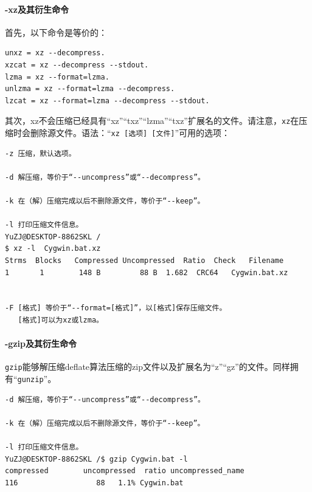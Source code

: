 \paragraph{-xz及其衍生命令}
首先，以下命令是等价的：\par
\begin{verbatim}
unxz = xz --decompress.
xzcat = xz --decompress --stdout.
lzma = xz --format=lzma.
unlzma = xz --format=lzma --decompress.
lzcat = xz --format=lzma --decompress --stdout.
\end{verbatim}\par
其次，xz不会压缩已经具有“xz”“txz”“lzma”“txz”扩展名的文件。请注意，\verb|xz|在压缩时会删除源文件。语法：“\verb|xz [选项] [文件]|”可用的选项：\par
\begin{verbatim}
-z 压缩，默认选项。

-d 解压缩，等价于“--uncompress”或“--decompress”。

-k 在（解）压缩完成以后不删除源文件，等价于“--keep”。

-l 打印压缩文件信息。
YuZJ@DESKTOP-8862SKL /
$ xz -l  Cygwin.bat.xz
Strms  Blocks   Compressed Uncompressed  Ratio  Check   Filename
1       1        148 B         88 B  1.682  CRC64   Cygwin.bat.xz


-F [格式] 等价于“--format=[格式]”，以[格式]保存压缩文件。
   [格式]可以为xz或lzma。
\end{verbatim}
\paragraph{-gzip及其衍生命令}
\verb|gzip|能够解压缩deflate算法压缩的zip文件以及扩展名为“z”“gz”的文件。同样拥有“\verb|gunzip|”。\par
\begin{verbatim}
-d 解压缩，等价于“--uncompress”或“--decompress”。

-k 在（解）压缩完成以后不删除源文件，等价于“--keep”。

-l 打印压缩文件信息。
YuZJ@DESKTOP-8862SKL /$ gzip Cygwin.bat -l
compressed        uncompressed  ratio uncompressed_name
116                  88   1.1% Cygwin.bat

\end{verbatim}
